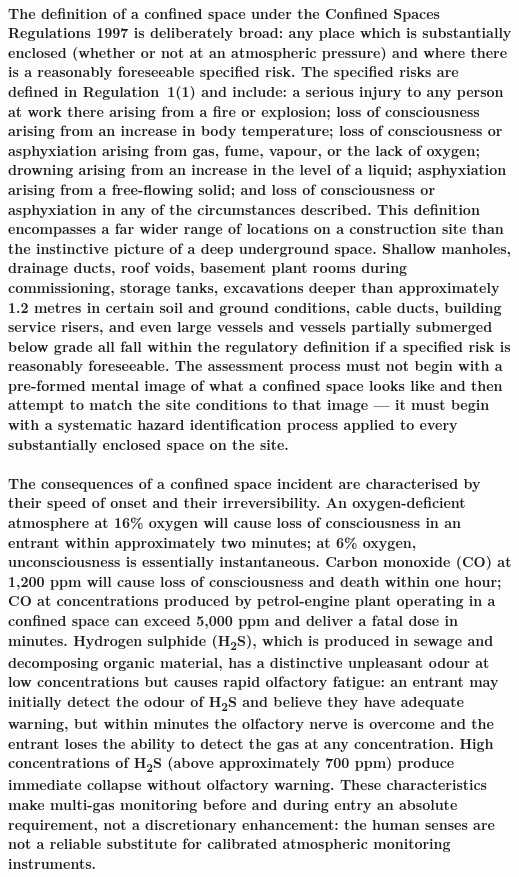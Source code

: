\paragraph{The definition of a confined space under the Confined Spaces Regulations 1997 is deliberately broad: any place which is substantially enclosed (whether or not at an atmospheric pressure) and where there is a reasonably foreseeable specified risk. The specified risks are defined in Regulation~1(1) and include: a serious injury to any person at work there arising from a fire or explosion; loss of consciousness arising from an increase in body temperature; loss of consciousness or asphyxiation arising from gas, fume, vapour, or the lack of oxygen; drowning arising from an increase in the level of a liquid; asphyxiation arising from a free-flowing solid; and loss of consciousness or asphyxiation in any of the circumstances described. This definition encompasses a far wider range of locations on a construction site than the instinctive picture of a deep underground space. Shallow manholes, drainage ducts, roof voids, basement plant rooms during commissioning, storage tanks, excavations deeper than approximately 1.2 metres in certain soil and ground conditions, cable ducts, building service risers, and even large vessels and vessels partially submerged below grade all fall within the regulatory definition if a specified risk is reasonably foreseeable. The assessment process must not begin with a pre-formed mental image of what a confined space looks like and then attempt to match the site conditions to that image --- it must begin with a systematic hazard identification process applied to every substantially enclosed space on the site.}

\paragraph{The consequences of a confined space incident are characterised by their speed of onset and their irreversibility. An oxygen-deficient atmosphere at 16\% oxygen will cause loss of consciousness in an entrant within approximately two minutes; at 6\% oxygen, unconsciousness is essentially instantaneous. Carbon monoxide (CO) at 1,200 ppm will cause loss of consciousness and death within one hour; CO at concentrations produced by petrol-engine plant operating in a confined space can exceed 5,000 ppm and deliver a fatal dose in minutes. Hydrogen sulphide (H\textsubscript{2}S), which is produced in sewage and decomposing organic material, has a distinctive unpleasant odour at low concentrations but causes rapid olfactory fatigue: an entrant may initially detect the odour of H\textsubscript{2}S and believe they have adequate warning, but within minutes the olfactory nerve is overcome and the entrant loses the ability to detect the gas at any concentration. High concentrations of H\textsubscript{2}S (above approximately 700 ppm) produce immediate collapse without olfactory warning. These characteristics make multi-gas monitoring before and during entry an absolute requirement, not a discretionary enhancement: the human senses are not a reliable substitute for calibrated atmospheric monitoring instruments.}

